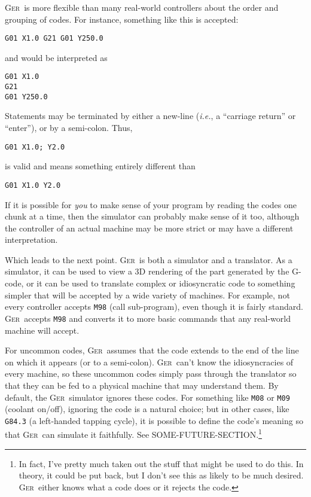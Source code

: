 \documentclass[titlepage,oneside,10pt]{article}
\newcommand{\ger}{\textsc{Ger}}
\begin{document}
\ger\ is more flexible than many real-world controllers about the order
and grouping of codes. For instance, something like this is accepted:
\begin{verbatim}
G01 X1.0 G21 G01 Y250.0
\end{verbatim}
and would be interpreted as
\begin{verbatim}
G01 X1.0 
G21 
G01 Y250.0
\end{verbatim}
Statements may be terminated by either a new-line (\emph{i.e.}, a
``carriage return'' or ``enter''), or by a semi-colon. Thus,
\begin{verbatim}
G01 X1.0; Y2.0
\end{verbatim}
is valid and means something entirely different than 
\begin{verbatim}
G01 X1.0 Y2.0
\end{verbatim}
If it is possible for \emph{you} to make sense of your program by 
reading the codes one chunk at a time, then the simulator can
probably make sense of it too, although the controller of an actual
machine may be more strict or may have a different interpretation.

Which leads to the next point. \ger\ is both a simulator and a
translator. As a simulator, it can be used to view a 3D rendering of
the part generated by the G-code, or it can be used to translate complex or
idiosyncratic code to something simpler that will be accepted by a
wide variety of machines. For example, not every controller accepts
{\tt M98} (call sub-program), even though it is fairly
standard. \ger\ accepts {\tt M98} and converts it to more basic
commands that any real-world machine will accept.

For uncommon codes, \ger\ assumes that the code extends to the end of
the line on which it appears (or to a semi-colon). \ger\ can't know
the idiosyncracies of every machine, so these uncommon codes simply
pass through the translator so that they can be fed to a physical
machine that may understand them. By default, the \ger\ simulator ignores
these codes. For something like {\tt M08} or {\tt M09} (coolant
on/off), ignoring the code is a natural choice; but in other cases,
like {\tt G84.3} (a left-handed tapping cycle), it is possible to
define the code's meaning so that \ger\ can simulate it
faithfully. See SOME-FUTURE-SECTION.\footnote{In fact, I've pretty
much taken out the stuff that might be used to do this. In theory, it
could be put back, but I don't see this as likely to be much
desired. \ger\ either knows what a code does or it rejects the code.}
\end{document}
